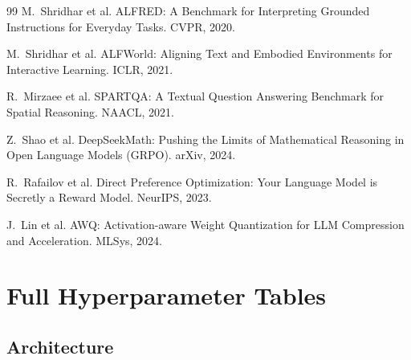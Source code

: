 \documentclass[11pt,a4paper]{article}
\begin{document}
\begin{thebibliography}{99}
M.~Shridhar et al.
\newblock ALFRED: A Benchmark for Interpreting Grounded Instructions for Everyday Tasks.
\newblock CVPR, 2020.

M.~Shridhar et al.
\newblock ALFWorld: Aligning Text and Embodied Environments for Interactive Learning.
\newblock ICLR, 2021.

R.~Mirzaee et al.
\newblock SPARTQA: A Textual Question Answering Benchmark for Spatial Reasoning.
\newblock NAACL, 2021.

Z.~Shao et al.
\newblock DeepSeekMath: Pushing the Limits of Mathematical Reasoning in Open Language Models (GRPO).
\newblock arXiv, 2024.

R.~Rafailov et al.
\newblock Direct Preference Optimization: Your Language Model is Secretly a Reward Model.
\newblock NeurIPS, 2023.

J.~Lin et al.
\newblock AWQ: Activation-aware Weight Quantization for LLM Compression and Acceleration.
\newblock MLSys, 2024.

\end{thebibliography}

\appendix

\section{Full Hyperparameter Tables}

\subsection{Architecture}
\end{document}
